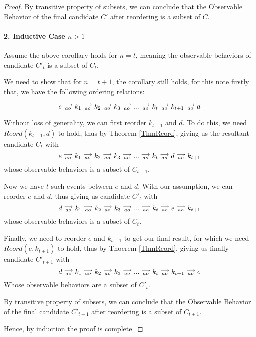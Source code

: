 \begin{proof}
        By transitive property of subsets, we can conclude that the Observable Behavior of the final candidate $C'$ after reordering is a subset of $C$.  

    \paragraph{2. Inductive Case $n > 1$}
        Assume the above corollary holds for $n = t$, meaning the observable behaviors of candidate $C'_t$ is a subset of $C_t$. 
        
        We need to show that for $n = t + 1$, the corollary still holds, for this note firstly that, we have the following ordering relations:
        
        \[
            e\stackrel{\longrightarrow}{_{ao}}k_1\stackrel{\longrightarrow}{_{ao}}k_2\stackrel{\longrightarrow}{_{ao}}k_3\stackrel{\longrightarrow}{_{ao}}...\stackrel{\longrightarrow}{_{ao}}k_t\stackrel{\longrightarrow}{_{ao}}k_{t+1}\stackrel{\longrightarrow}{_{ao}}d  
        \]

        Without loss of generality, we can first reorder $k_{t+1}$ and $d$. To do this, we need $Reord(k_{t+1}, d)$ to hold, thus by Theorem \ref{ThmReord}, giving us the resultant candidate $C_t$ with  
        \[
            e\stackrel{\longrightarrow}{_{ao}}k_1\stackrel{\longrightarrow}{_{ao}}k_2\stackrel{\longrightarrow}{_{ao}}k_3\stackrel{\longrightarrow}{_{ao}}...\stackrel{\longrightarrow}{_{ao}}k_t\stackrel{\longrightarrow}{_{ao}}d\stackrel{\longrightarrow}{_{ao}}k_{t+1}  
        \]
        whose observable behaviors is a subset of $C_{t+1}$. 

        Now we have $t$ such events between $e$ and $d$. With our assumption, we can reorder $e$ and $d$, thus giving us candidate $C'_t$ with 
        \[
            d\stackrel{\longrightarrow}{_{ao}}k_1\stackrel{\longrightarrow}{_{ao}}k_2\stackrel{\longrightarrow}{_{ao}}k_3\stackrel{\longrightarrow}{_{ao}}...\stackrel{\longrightarrow}{_{ao}}k_t\stackrel{\longrightarrow}{_{ao}}e\stackrel{\longrightarrow}{_{ao}}k_{t+1}  
        \]
        whose observable behaviors is a subset of $C_{t}$. 

        Finally, we need to reorder $e$ and $k_{t+1}$ to get our final result, for which we need $Reord(e, k_{t+1})$ to hold, thus by Thoerem \ref{ThmReord},  giving us finally candidate $C'_{t+1}$ with
        \[
            d\stackrel{\longrightarrow}{_{ao}}k_1\stackrel{\longrightarrow}{_{ao}}k_2\stackrel{\longrightarrow}{_{ao}}k_3\stackrel{\longrightarrow}{_{ao}}...\stackrel{\longrightarrow}{_{ao}}k_t\stackrel{\longrightarrow}{_{ao}}k_{t+1}\stackrel{\longrightarrow}{_{ao}}e  
        \]
        Whose observable behaviors are a subset of $C'_t$. 

        By transitive property of subsets, we can conclude that the Observable Behavior of the final candidate $C'_{t+1}$ after reordering is a subset of $C_{t+1}$.

        Hence, by induction the proof is complete. 
\end{proof}
    

